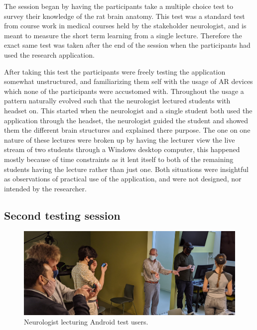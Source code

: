 The session began by having the participants take a multiple choice test to survey their knowledge of the rat brain anatomy. This test was a standard test from course work in medical courses held by the stakeholder neurologist, and is meant to measure the short term learning from a single lecture. Therefore the exact same test was taken after the end of the session when the participants had used the research application.

After taking this test the participants were freely testing the application somewhat unstructured, and familiarizing them self with the usage of AR devices which none of the participants were accustomed with. Throughout the usage a pattern naturally evolved such that the neurologist lectured students with headset on. This started when the neurologist and a single student both used the application through the headset, the neurologist guided the student and showed them the different brain structures and explained there purpose. The one on one nature of these lectures were broken up by having the lecturer view the live stream of two students through a Windows desktop computer, this happened mostly because of time constraints as it lent itself to both of the remaining students having the lecture rather than just one. 
Both situations were insightful as observations of practical use of the application, and were not designed, nor intended by the researcher. 



\subsection{Second testing session}



\begin{figure}
    \includegraphics[width={\textwidth},trim={0 0 16cm 0},clip]{fig/usertestmennobeingmenno.jpg}
    \caption{Neurologist lecturing Android test users.}
    \label{fig:usertestmennobeingmenno}
\end{figure}


